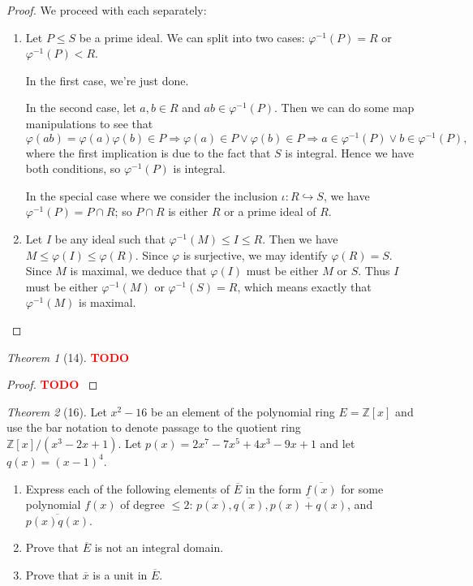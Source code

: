\documentclass[12pt]{article}
\theoremstyle{remark}
\theoremstyle{named}
\newtheorem*{theorem}{Theorem}
\newcommand{\todo}{\textcolor{red}{\textbf{TODO} }}
\newcommand{\Z}{\mathbb Z}
\begin{document}
\begin{proof}
    We proceed with each separately:
    \begin{enumerate}
        \item Let \(P \le S\) be a prime ideal. We can split into two cases: \(\varphi^{-1}(P) = R\) or \(\varphi^{-1}(P) < R\).
        
        In the first case, we're just done. 

        In the second case, let \(a, b \in R\) and \(ab \in \varphi^{-1}(P)\). Then we can do some map manipulations to see that 
        \[\varphi(ab) = \varphi(a)\varphi(b) \in P \Rightarrow \varphi(a) \in P \lor \varphi(b) \in P \Rightarrow a \in \varphi^{-1}(P) \lor b \in \varphi^{-1}(P),\]
        where the first implication is due to the fact that \(S\) is integral. Hence we have both conditions, so \(\varphi^{-1}(P)\) is integral.

        In the special case where we consider the inclusion \(\iota : R \hookrightarrow S\), we have \(\varphi^{-1}(P) = P \cap R\); so \(P \cap R\) is either \(R\) or a prime ideal of \(R\).
        \item Let \(I\) be any ideal such that \(\varphi^{-1}(M) \le I \le R\). Then we have \(M \le \varphi(I) \le \varphi(R)\). Since \(\varphi\) is surjective, we may identify \(\varphi(R) = S\). Since \(M\) is maximal, we deduce that \(\varphi(I)\) must be either \(M\) or \(S\). Thus \(I\) must be either \(\varphi^{-1}(M)\) or \(\varphi^{-1}(S) = R\), which means exactly that \(\varphi^{-1}(M)\) is maximal.
    \end{enumerate}
\end{proof}

\begin{theorem}[14]
    \todo
\end{theorem}

\begin{proof}
    \todo
\end{proof}

\begin{theorem}[16]
    Let \(x^2 - 16\) be an element of the polynomial ring \(E = \Z[x]\) and use the bar notation to denote passage to the quotient ring \(\Z[x]/(x^3 - 2x + 1)\). Let \(p(x) = 2x^7 - 7x^5 + 4x^3 - 9x + 1\) and let \(q(x) = (x - 1)^4\).
    \begin{enumerate}
        \item Express each of the following elements of \(\overline{E}\) in the form \(\overline{f(x)}\) for some polynomial \(f(x)\) of degree \(\le 2\): \(\overline{p(x)}, \overline{q(x)}, \overline{p(x) + q(x)}\), and \(\overline{p(x)q(x)}\).
        \item Prove that \(\overline{E}\) is not an integral domain.
        \item Prove that \(\overline{x}\) is a unit in \(\overline{E}\).
    \end{enumerate}
\end{theorem}
\end{document}

